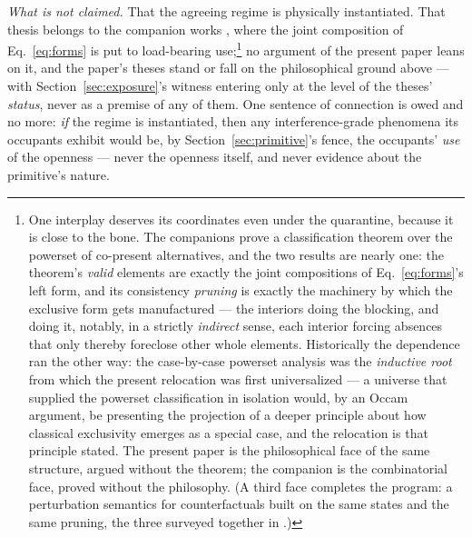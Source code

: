\documentclass[11pt]{article}
\begin{document}
\emph{What is not claimed.} That the agreeing regime is physically instantiated. That thesis belongs to the companion works \parencite{Aethus, AethusBrief}, where the joint composition of Eq.~\eqref{eq:forms} is put to load-bearing use;\footnote{One interplay deserves its coordinates even under the quarantine, because it is close to the bone. The companions prove a classification theorem over the powerset of co-present alternatives, and the two results are nearly one: the theorem's \emph{valid} elements are exactly the joint compositions of Eq.~\eqref{eq:forms}'s left form, and its consistency \emph{pruning} is exactly the machinery by which the exclusive form gets manufactured --- the interiors doing the blocking, and doing it, notably, in a strictly \emph{indirect} sense, each interior forcing absences that only thereby foreclose other whole elements. Historically the dependence ran the other way: the case-by-case powerset analysis was the \emph{inductive root} from which the present relocation was first universalized --- a universe that supplied the powerset classification in isolation would, by an Occam argument, be presenting the projection of a deeper principle about how classical exclusivity emerges as a special case, and the relocation is that principle stated. The present paper is the philosophical face of the same structure, argued without the theorem; the companion is the combinatorial face, proved without the philosophy. (A third face completes the program: a perturbation semantics for counterfactuals built on the same states and the same pruning, the three surveyed together in \parencite{AethusBrief}.)} no argument of the present paper leans on it, and the paper's theses stand or fall on the philosophical ground above --- with Section~\ref{sec:exposure}'s witness entering only at the level of the theses' \emph{status}, never as a premise of any of them. One sentence of connection is owed and no more: \emph{if} the regime is instantiated, then any interference-grade phenomena its occupants exhibit would be, by Section~\ref{sec:primitive}'s fence, the occupants' \emph{use} of the openness --- never the openness itself, and never evidence about the primitive's nature.
\end{document}
